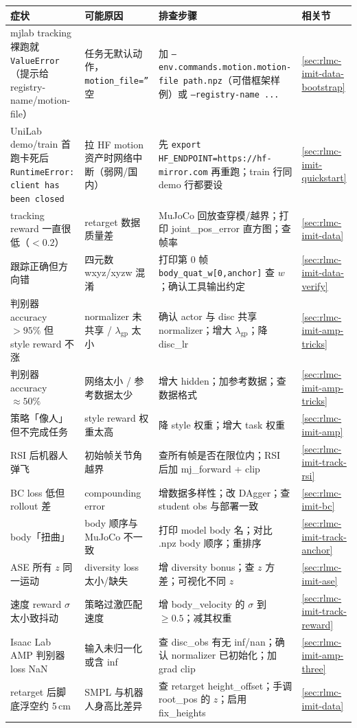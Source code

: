 \begin{center}
\small
\begin{tabular}{@{}p{3.3cm}p{3.0cm}p{4.5cm}l@{}}
\toprule
症状 & 可能原因 & 排查步骤 & 相关节 \\
\midrule
mjlab tracking 裸跑就 \texttt{ValueError}（提示给 registry-name/motion-file） & 任务无默认动作，\texttt{motion\_file=''} 空 & 加 \texttt{--env.commands.motion.motion-file path.npz}（可借框架样例）或 \texttt{--registry-name ...} & \cref{sec:rlmc-imit-data-bootstrap} \\
UniLab demo/train 首跑卡死后 \texttt{RuntimeError: client has been closed} & 拉 HF motion 资产时网络中断（弱网/国内） & 先 \texttt{export HF\_ENDPOINT=https://hf-mirror.com} 再重跑；train 行同 demo 行都要设 & \cref{sec:rlmc-imit-quickstart} \\
tracking reward 一直很低（$<0.2$） & retarget 数据质量差 & MuJoCo 回放查穿模/越界；打印 joint\_pos\_error 直方图；查帧率 & \cref{sec:rlmc-imit-data} \\
跟踪正确但方向错 & 四元数 wxyz/xyzw 混淆 & 打印第 0 帧 \texttt{body\_quat\_w[0,anchor]} 查 $w$；确认工具输出约定 & \cref{sec:rlmc-imit-data-verify} \\
判别器 accuracy $>95\%$ 但 style reward 不涨 & normalizer 未共享 / $\lambda_{\text{gp}}$ 太小 & 确认 actor 与 disc 共享 normalizer；增大 $\lambda_{\text{gp}}$；降 disc\_lr & \cref{sec:rlmc-imit-amp-tricks} \\
判别器 accuracy $\approx50\%$ & 网络太小 / 参考数据太少 & 增大 hidden；加参考数据；查数据格式 & \cref{sec:rlmc-imit-amp-tricks} \\
策略「像人」但不完成任务 & style reward 权重太高 & 降 style 权重；增大 task 权重 & \cref{sec:rlmc-imit-amp} \\
RSI 后机器人弹飞 & 初始帧关节角越界 & 查所有帧是否在限位内；RSI 后加 mj\_forward + clip & \cref{sec:rlmc-imit-track-rsi} \\
BC loss 低但 rollout 差 & compounding error & 增数据多样性；改 DAgger；查 student obs 与部署一致 & \cref{sec:rlmc-imit-bc} \\
body「扭曲」 & body 顺序与 MuJoCo 不一致 & 打印 model body 名；对比 .npz body 顺序；重排序 & \cref{sec:rlmc-imit-track-anchor} \\
ASE 所有 $z$ 同一运动 & diversity loss 太小/缺失 & 增 diversity bonus；查 $z$ 方差；可视化不同 $z$ & \cref{sec:rlmc-imit-ase} \\
速度 reward $\sigma$ 太小致抖动 & 策略过激匹配速度 & 增 body\_velocity 的 $\sigma$ 到 $\ge0.5$；减其权重 & \cref{sec:rlmc-imit-track-reward} \\
Isaac Lab AMP 判别器 loss NaN & 输入未归一化或含 inf & 查 disc\_obs 有无 inf/nan；确认 normalizer 已初始化；加 grad clip & \cref{sec:rlmc-imit-amp-three} \\
retarget 后脚底浮空约 5\,cm & SMPL 与机器人身高比差异 & 查 retarget height\_offset；手调 root\_pos 的 $z$；启用 fix\_heights & \cref{sec:rlmc-imit-data} \\
\bottomrule
\end{tabular}
\end{center}

